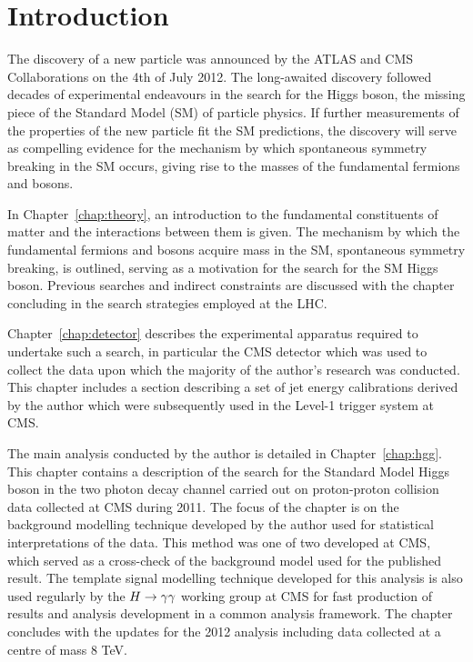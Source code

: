 \chapter{Introduction}
\label{chap:introduction}

The discovery of a new particle was announced by the ATLAS and CMS
Collaborations on the 4th of July 2012. The long-awaited discovery 
followed decades of experimental endeavours in the search for the
Higgs boson, the missing piece of the Standard Model (SM) of particle physics.
If further measurements of the properties of the new particle fit the SM predictions, 
the discovery will serve as compelling evidence for the mechanism by which
spontaneous symmetry breaking in the SM occurs, giving rise
to the masses of the fundamental fermions and bosons. 

In Chapter~\ref{chap:theory}, an introduction to the fundamental constituents of
matter and the interactions between them is given. The mechanism by which 
the fundamental fermions and bosons acquire mass in the SM, spontaneous symmetry breaking,
is outlined, serving as a motivation for the search for the SM Higgs boson. 
Previous searches and indirect constraints are discussed with the chapter concluding in
the search strategies employed at the LHC.

Chapter~\ref{chap:detector} describes the experimental apparatus required to undertake 
such a search, in particular the CMS detector which was used to collect the data upon which 
the majority of the author's research was conducted. This chapter includes a section describing 
a set of jet energy calibrations derived by the author which were subsequently used  
in the Level-1 trigger system at CMS.

The main analysis conducted by the author is detailed in Chapter~\ref{chap:hgg}. This chapter 
contains a description of the search for the Standard Model Higgs boson in the two
photon decay channel carried out on proton-proton collision data collected at CMS during 2011.
The focus of the chapter is on the background modelling technique developed by the author
used for statistical interpretations of the data. This method was one of two developed at CMS, 
which served as a cross-check of the background model used for the published result. 
The template signal modelling technique developed for this analysis is also used regularly by the $H\rightarrow\gamma\gamma$
working group at CMS for fast production of results and analysis development in a common analysis framework.
The chapter concludes with the updates for the 2012 analysis including data
collected at a centre of mass 8 TeV. 

